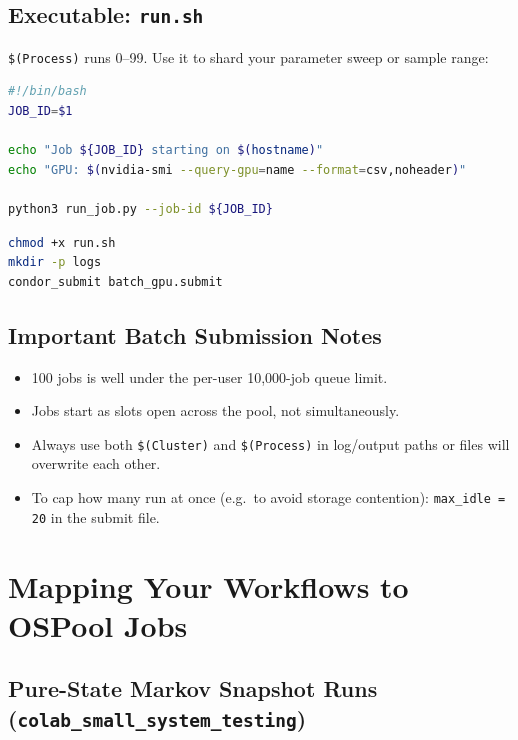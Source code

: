 \documentclass[11pt]{article}
\begin{document}
\subsection{Executable: \texttt{run.sh}}

\texttt{\$(Process)} runs 0--99. Use it to shard your parameter sweep or
sample range:

\begin{lstlisting}[language=bash]
#!/bin/bash
JOB_ID=$1

echo "Job ${JOB_ID} starting on $(hostname)"
echo "GPU: $(nvidia-smi --query-gpu=name --format=csv,noheader)"

python3 run_job.py --job-id ${JOB_ID}
\end{lstlisting}

\begin{lstlisting}[language=bash]
chmod +x run.sh
mkdir -p logs
condor_submit batch_gpu.submit
\end{lstlisting}

\subsection{Important Batch Submission Notes}

\begin{itemize}[leftmargin=*]
    \item 100 jobs is well under the per-user 10,000-job queue limit.
    \item Jobs start as slots open across the pool, not simultaneously.
    \item Always use both \texttt{\$(Cluster)} and \texttt{\$(Process)} in
          log/output paths or files will overwrite each other.
    \item To cap how many run at once (e.g.\ to avoid storage contention):
          \texttt{max\_idle = 20} in the submit file.
\end{itemize}

\section{Mapping Your Workflows to OSPool Jobs}

\subsection{Pure-State Markov Snapshot Runs (\texttt{colab\_small\_system\_testing})}
\end{document}
